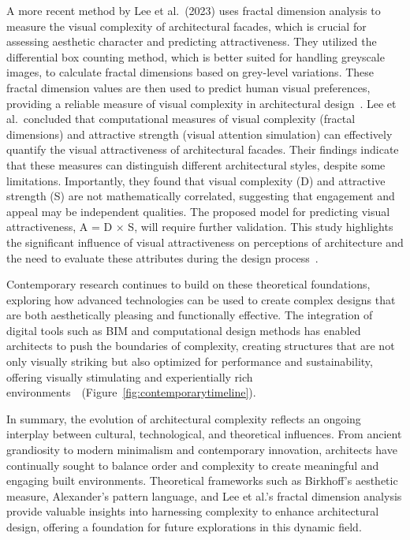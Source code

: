 A more recent method by Lee et al.~(2023) uses fractal dimension analysis to measure the visual complexity of architectural facades, which is crucial for assessing aesthetic character and predicting attractiveness.
They utilized the differential box counting method, which is better suited for handling greyscale images, to calculate fractal dimensions based on grey-level variations.
These fractal dimension values are then used to predict human visual preferences, providing a reliable measure of visual complexity in architectural design~\cite{Lee2023}.
Lee et al.~concluded that computational measures of visual complexity (fractal dimensions) and attractive strength (visual attention simulation) can effectively quantify the visual attractiveness of architectural facades.
Their findings indicate that these measures can distinguish different architectural styles, despite some limitations.
Importantly, they found that visual complexity (D) and attractive strength (S) are not mathematically correlated, suggesting that engagement and appeal may be independent qualities.
The proposed model for predicting visual attractiveness, A = D × S, will require further validation.
This study highlights the significant influence of visual attractiveness on perceptions of architecture and the need to evaluate these attributes during the design process~\cite{Lee2023}.

Contemporary research continues to build on these theoretical foundations, exploring how advanced technologies can be used to create complex designs that are both aesthetically pleasing and functionally effective.
The integration of digital tools such as BIM and computational design methods has enabled architects to push the boundaries of complexity, creating structures that are not only visually striking but also optimized for performance and sustainability, offering visually stimulating and experientially rich environments~\cite{Leach2016}~(Figure~\ref{fig:contemporarytimeline}).

In summary, the evolution of architectural complexity reflects an ongoing interplay between cultural, technological, and theoretical influences.
From ancient grandiosity to modern minimalism and contemporary innovation, architects have continually sought to balance order and complexity to create meaningful and engaging built environments.
Theoretical frameworks such as Birkhoff's aesthetic measure, Alexander's pattern language, and Lee et al.'s fractal dimension analysis provide valuable insights into harnessing complexity to enhance architectural design, offering a foundation for future explorations in this dynamic field.

